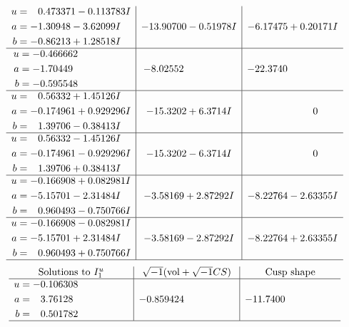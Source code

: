 \documentclass[1p]{elsarticle_modified}
\theoremstyle{definition}
\newcommand{\I}{\sqrt{-1}}
\begin{document}
$$\begin{array}{c|c|c}
\begin{aligned}
u &= \phantom{-}0.473371 - 0.113783 I \\
a &= -1.30948 - 3.62099 I \\
b &= -0.86213 + 1.28518 I\end{aligned}
 & -13.90700 - 0.51978 I & -6.17475 + 0.20171 I \\ \hline\begin{aligned}
u &= -0.466662\phantom{ +0.000000I} \\
a &= -1.70449\phantom{ +0.000000I} \\
b &= -0.595548\phantom{ +0.000000I}\end{aligned}
 & -8.02552\phantom{ +0.000000I} & -22.3740\phantom{ +0.000000I} \\ \hline\begin{aligned}
u &= \phantom{-}0.56332 + 1.45126 I \\
a &= -0.174961 + 0.929296 I \\
b &= \phantom{-}1.39706 - 0.38413 I\end{aligned}
 & -15.3202 + 6.3714 I & \phantom{-0.000000 } 0 \\ \hline\begin{aligned}
u &= \phantom{-}0.56332 - 1.45126 I \\
a &= -0.174961 - 0.929296 I \\
b &= \phantom{-}1.39706 + 0.38413 I\end{aligned}
 & -15.3202 - 6.3714 I & \phantom{-0.000000 } 0 \\ \hline\begin{aligned}
u &= -0.166908 + 0.082981 I \\
a &= -5.15701 - 2.31484 I \\
b &= \phantom{-}0.960493 - 0.750766 I\end{aligned}
 & -3.58169 + 2.87292 I & -8.22764 - 2.63355 I \\ \hline\begin{aligned}
u &= -0.166908 - 0.082981 I \\
a &= -5.15701 + 2.31484 I \\
b &= \phantom{-}0.960493 + 0.750766 I\end{aligned}
 & -3.58169 - 2.87292 I & -8.22764 + 2.63355 I\\
 \hline 
 \end{array}$$\newpage$$\begin{array}{c|c|c}  
\text{Solutions to }I^u_{1}& \I (\text{vol} + \sqrt{-1}CS) & \text{Cusp shape}\\
 \hline 
\begin{aligned}
u &= -0.106308\phantom{ +0.000000I} \\
a &= \phantom{-}3.76128\phantom{ +0.000000I} \\
b &= \phantom{-}0.501782\phantom{ +0.000000I}\end{aligned}
 & -0.859424\phantom{ +0.000000I} & -11.7400\phantom{ +0.000000I}\\
 \hline 
 \end{array}$$\newpage\newpage\renewcommand{\arraystretch}{1}
\end{document}

